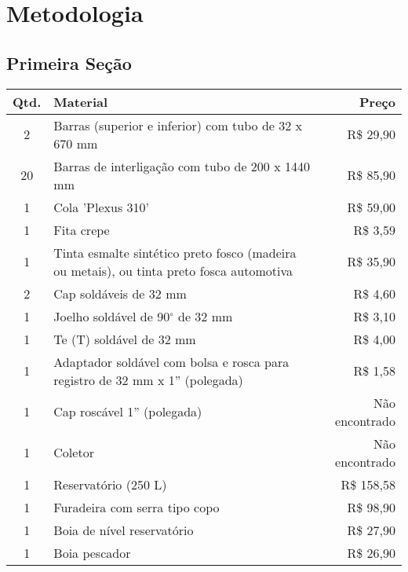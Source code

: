 \chapter{Metodologia}

\lipsum[1]
	
\section{Primeira Seção}

\lipsum[2]

	\begin{table}[!ht]
		{
		\begin{tabular}{c|l|r}
		\toprule
		
		Qtd. & Material & Preço\\
		
		\midrule
		
		2  & Barras (superior e inferior) com tubo de 32 x 670 mm & R\$ 29,90\\
		20 & Barras de interligação com tubo de 200 x 1440 mm     & R\$ 85,90\\
		1  & Cola 'Plexus 310'                                    & R\$ 59,00\\
		1  & Fita crepe                                           & R\$ 3,59\\
		1  & Tinta esmalte sintético preto fosco (madeira ou metais), ou tinta preto fosca automotiva & R\$ 35,90\\
		2  & Cap soldáveis de 32 mm                               & R\$ 4,60\\
		1  & Joelho soldável de 90$^{\circ}$ de 32 mm             & R\$ 3,10\\
		1  & Te (T) soldável de 32 mm                             & R\$ 4,00\\
		1  & Adaptador soldável com bolsa e rosca para registro de 32 mm x 1'' (polegada) & R\$ 1,58\\
		1  & Cap roscável 1'' (polegada)                          & Não encontrado\\
		1  & Coletor                                              & Não encontrado\\
		1  & Reservatório (250 L)                                 & R\$ 158,58\\
		1  & Furadeira com serra tipo copo                        & R\$ 98,90\\
		1  & Boia de nível reservatório                           & R\$ 27,90\\
		1  & Boia pescador                                        & R\$ 26,90\\
		

\end{tabular}}
\end{table}
